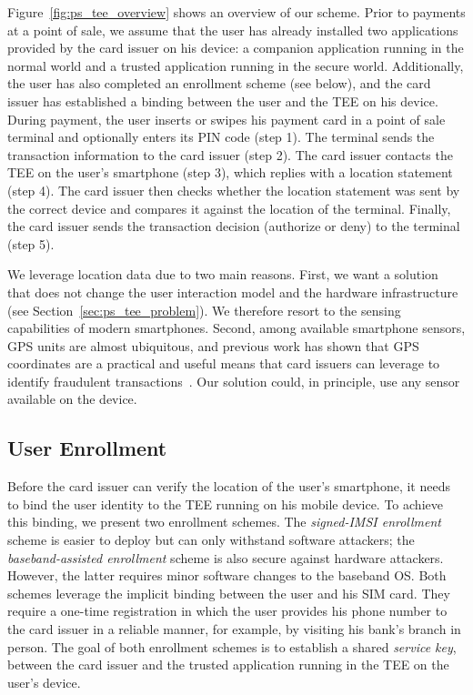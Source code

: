 Figure~\ref{fig:ps_tee_overview} shows an overview of our scheme. Prior to payments at a point of sale, we assume that the user has already installed two applications
provided by the card issuer on his device: a companion application running in
the normal world and a trusted application running in the secure world.
Additionally, the user has also completed an enrollment scheme (see below), and
the card issuer has established a binding between the user and the TEE on his
device.  During payment, the user inserts or swipes his payment card in a point
of sale terminal and optionally enters its PIN code (step 1). The terminal sends
the transaction information to the card issuer (step 2). The card issuer
contacts the TEE on the user's smartphone (step 3), which replies with a
location statement (step 4). The card issuer then checks whether the location
statement was sent by the correct device and compares it against the location of
the terminal. Finally, the card issuer sends the transaction decision (authorize
or deny) to the terminal (step 5).

We leverage location data due to two main reasons.  First, we want a solution
that does not change the user interaction model and the hardware infrastructure
(see Section~\ref{sec:ps_tee_problem}). We therefore resort to the sensing capabilities
of modern smartphones. Second, among available smartphone sensors, GPS units are
almost ubiquitous, and previous work has shown that GPS coordinates are a
practical and useful means that card issuers can leverage to identify fraudulent
transactions~\cite{mastercardpatent,park09acsac}. Our solution could, in
principle, use any sensor available on the device.

\subsection{User Enrollment}
\label{sec:ps_tee_enrollment}

Before the card issuer can verify the location of the user's smartphone, it
needs to bind the user identity to the TEE running on his mobile device.  To
achieve this binding, we present two enrollment schemes.  The \emph{signed-IMSI
  enrollment} scheme is easier to deploy but can only withstand software
attackers; the \emph{baseband-assisted enrollment} scheme is also secure against
hardware attackers. However, the latter requires minor software changes to the baseband
OS.  Both schemes leverage the implicit binding between the user and his SIM
card.  They require a one-time registration in which the user provides his phone
number to the card issuer in a reliable manner, for example, by visiting his
bank's branch in person.  The goal of both enrollment schemes is to establish a
shared \emph{service key}, between the card issuer and the trusted application
running in the TEE on the user's device.

